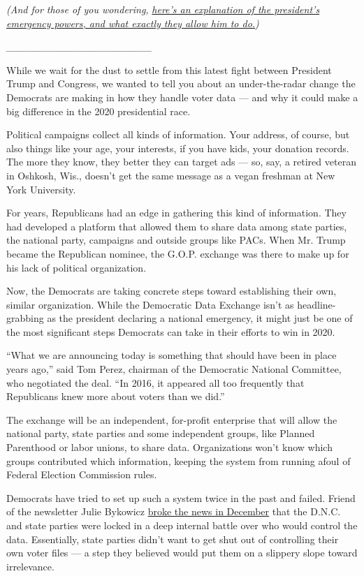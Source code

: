 \emph{(And for those of you wondering,}
\href{https://www.nytimes3xbfgragh.onion/2019/01/07/us/politics/trump-national-emergency.html}{\emph{here's
an explanation of the president's emergency powers, and what exactly
they allow him to do.}}\emph{)}

\emph{\_\_\_\_\_\_\_\_\_\_\_\_\_\_\_\_\_\_\_\_}

While we wait for the dust to settle from this latest fight between
President Trump and Congress, we wanted to tell you about an
under-the-radar change the Democrats are making in how they handle voter
data --- and why it could make a big difference in the 2020 presidential
race.

Political campaigns collect all kinds of information. Your address, of
course, but also things like your age, your interests, if you have kids,
your donation records. The more they know, they better they can target
ads --- so, say, a retired veteran in Oshkosh, Wis., doesn't get the
same message as a vegan freshman at New York University.

For years, Republicans had an edge in gathering this kind of
information. They had developed a platform that allowed them to share
data among state parties, the national party, campaigns and outside
groups like PACs. When Mr. Trump became the Republican nominee, the
G.O.P. exchange was there to make up for his lack of political
organization.

Now, the Democrats are taking concrete steps toward establishing their
own, similar organization. While the Democratic Data Exchange isn't as
headline-grabbing as the president declaring a national emergency, it
might just be one of the most significant steps Democrats can take in
their efforts to win in 2020.

``What we are announcing today is something that should have been in
place years ago,'' said Tom Perez, chairman of the Democratic National
Committee, who negotiated the deal. ``In 2016, it appeared all too
frequently that Republicans knew more about voters than we did.''

The exchange will be an independent, for-profit enterprise that will
allow the national party, state parties and some independent groups,
like Planned Parenthood or labor unions, to share data. Organizations
won't know which groups contributed which information, keeping the
system from running afoul of Federal Election Commission rules.

Democrats have tried to set up such a system twice in the past and
failed. Friend of the newsletter Julie Bykowicz
\href{https://www.wsj.com/articles/fight-over-voter-data-roils-democrats-ahead-of-election-11544899956}{broke
the news in December} that the D.N.C. and state parties were locked in a
deep internal battle over who would control the data. Essentially, state
parties didn't want to get shut out of controlling their own voter files
--- a step they believed would put them on a slippery slope toward
irrelevance.

